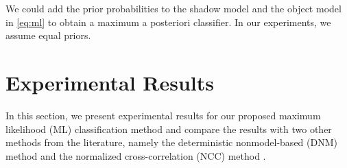 We could add the prior probabilities to the shadow model and the
object model in \ref{eq:ml} to obtain a maximum a posteriori
classifier. In our experiments, we assume equal priors.

\section{Experimental Results}
\label{sec:shadow-results}

In this section, we present experimental results for our proposed
maximum likelihood (ML) classification method and compare the results
with two other methods from the literature, namely the deterministic
nonmodel-based (DNM)
method  and the normalized
cross-correlation (NCC)
method .

